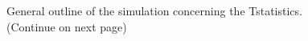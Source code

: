 \documentclass[12pt]{article}\usepackage[]{graphicx}\usepackage[]{color}
\begin{document}
\begin{figure}[h]
\centering
\hspace*{-0.8cm}
\vspace*{-0.5cm}
\caption[General outline of the simulation concerning the Tstatistics]{General outline of the simulation concerning the Tstatistics. (Continue on next page) }
\label{fig:General_outline}
\end{figure}
\end{document}
